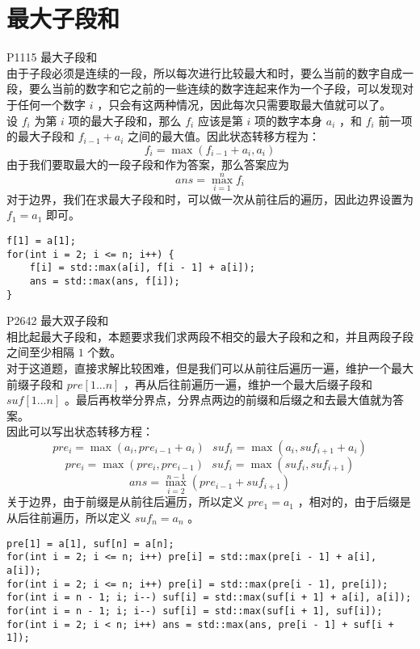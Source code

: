 \documentclass{beamer}
\begin{document}
\section{最大子段和}
\begin{frame}
P1115 最大子段和\\ 
由于子段必须是连续的一段，所以每次进行比较最大和时，要么当前的数字自成一段，要么当前的数字和它之前的一些连续的数字连起来作为一个子段，可以发现对于任何一个数字 $i$ ，只会有这两种情况，因此每次只需要取最大值就可以了。 \\ 
设 $f_i$ 为第 $i$ 项的最大子段和，那么 $f_i$ 应该是第 $i$ 项的数字本身 $a_i$ ，和 $f_i$ 前一项的最大子段和 $f_{i - 1} + a_i$ 之间的最大值。因此状态转移方程为：
$$f_i = \max(f_{i - 1} + a_i, a_i)$$
由于我们要取最大的一段子段和作为答案，那么答案应为 
$$ans = \max_{i = 1}^{n}f_i$$
对于边界，我们在求最大子段和时，可以做一次从前往后的遍历，因此边界设置为 $f_1 = a_1$ 即可。
\end{frame}
\begin{frame}[fragile]
\begin{onlyenv}
\begin{verbatim}
f[1] = a[1];
for(int i = 2; i <= n; i++) {
    f[i] = std::max(a[i], f[i - 1] + a[i]);
    ans = std::max(ans, f[i]);
}
\end{verbatim}
\end{onlyenv}
\end{frame}
\begin{frame}
P2642 最大双子段和\\ 
相比起最大子段和，本题要求我们求两段不相交的最大子段和之和，并且两段子段之间至少相隔 $1$ 个数。\\ 
对于这道题，直接求解比较困难，但是我们可以从前往后遍历一遍，维护一个最大前缀子段和 $pre[1...n]$ ，再从后往前遍历一遍，维护一个最大后缀子段和 $suf[1...n]$ 。最后再枚举分界点，分界点两边的前缀和后缀之和去最大值就为答案。 \\ 
因此可以写出状态转移方程：\\ 
$$pre_i = \max(a_i, pre_{i - 1} + a_i) \ \ \ suf_i = \max(a_i, suf_{i + 1} + a_i)$$
$$pre_i = \max(pre_i, pre_{i - 1}) \ \ \ suf_i = \max(suf_i, suf_{i + 1})$$
$$ans = \max_{i = 2}^{n - 1}(pre_{i - 1} + suf_{i + 1})$$
关于边界，由于前缀是从前往后遍历，所以定义 $pre_1 = a_1$ ，相对的，由于后缀是从后往前遍历，所以定义 $suf_n = a_n$ 。
\end{frame}
\begin{frame}[fragile]
\begin{onlyenv}
\begin{verbatim}
pre[1] = a[1], suf[n] = a[n];
for(int i = 2; i <= n; i++) pre[i] = std::max(pre[i - 1] + a[i], a[i]);
for(int i = 2; i <= n; i++) pre[i] = std::max(pre[i - 1], pre[i]);
for(int i = n - 1; i; i--) suf[i] = std::max(suf[i + 1] + a[i], a[i]);
for(int i = n - 1; i; i--) suf[i] = std::max(suf[i + 1], suf[i]);
for(int i = 2; i < n; i++) ans = std::max(ans, pre[i - 1] + suf[i + 1]);
\end{verbatim}
\end{onlyenv}
\end{frame}
\end{document}

